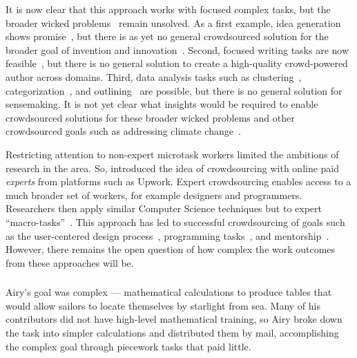 \documentclass[trackingWork]{subfiles}
\begin{document}
It is now clear that this approach works with focused complex tasks, but the broader wicked problems~\cite{rittel1973dilemmas} remain unsolved. 
As a first example, idea generation shows promise~\cite{YuEncouragingOutside,yu2014distributed,Yu2016a}, but there is as yet no general crowdsourced solution for the broader goal of invention and innovation~\cite{fuge2014analysis}. 
Second, focused writing tasks are now feasible~\cite{Kim2017,bernsteinSoylent,Nebeling:2016:WCW:2858036.2858169,writingMicroTasks,agapie2015crowdsourcing}, but there is no general solution to create a high-quality crowd-powered author across domains. 
Third, data analysis tasks such as clustering~\cite{chilton2013cascade}, categorization~\cite{andre2014crowd}, and outlining~\cite{luther2015crowdlines} are possible, but there is no general solution for sensemaking.
It is not yet clear what insights would be required to enable crowdsourced solutions for these broader wicked problems and other crowdsourced goals such as addressing climate change~\cite{introne2011climate}.

Restricting attention to non-expert microtask workers limited the ambitions of research in the area. 
So, \citeauthor{foundry} introduced the idea of crowdsourcing with online paid \textit{experts} from platforms such as Upwork.
Expert crowdsourcing enables access to a much broader set of workers, for example designers and programmers.
Researchers then apply similar Computer Science techniques but to expert ``macro-tasks''~\cite{cheng2015break,haas2015argonaut}.
This approach has led to successful crowdsourcing of goals such as the user-centered design process~\cite{foundry}, programming tasks~\cite{latoza2014microtask,Fast2016,Chen2016}, and mentorship~\cite{suzukiAtelier}.
However, there remains the open question of how complex the work outcomes from these approaches will be.


\subsubsection{\pieceworkpers}

\begin{comment}
- Farm workers-->textile
- Limit: human management and oversight
- Evaluation
- Skilled work harder
- Only some organizations can use it
- Management practices
\end{comment}

Airy's goal was complex --- mathematical calculations to produce tables that would allow sailors to locate themselves by starlight from sea. 
Many of his contributors did not have high-level mathematical training, so Airy broke down the task into simpler calculations and distributed them by mail, accomplishing the complex goal through piecework tasks that paid little.
\end{document}
